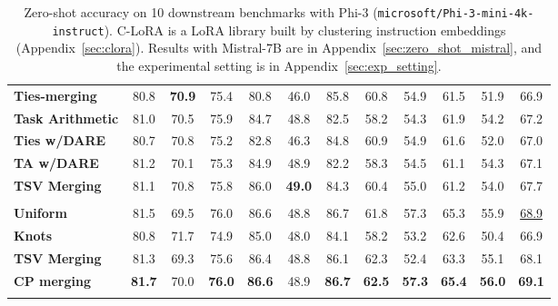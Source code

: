 \begin{table}[ht]
\begin{adjustbox}
\begin{tabular}{l|cccccccccc|c}
\textbf{Ties-merging} & 80.8 & \textbf{70.9} & 75.4 & 80.8 & 46.0 & 85.8 & 60.8 & 54.9 & 61.5 & 51.9 & \cellcolor[HTML]{FDE9E8}66.9 \\
\textbf{Task Arithmetic} & 81.0 & 70.5 & 75.9 & 84.7 & 48.8 & 82.5 & 58.2 & 54.3 & 61.9 & 54.2 & \cellcolor[HTML]{FDE9E8}67.2\\
\textbf{Ties w/DARE} & 80.7 & 70.8 & 75.2 & 82.8 & 46.3 & 84.8 & 60.9 & 54.9 & 61.6 & 52.0 & \cellcolor[HTML]{FDE9E8}67.0  \\
\textbf{TA w/DARE} & 81.2 & 70.1 & 75.3 & 84.9 & 48.9 & 82.2 & 58.3 & 54.5 & 61.1 & 54.3 & \cellcolor[HTML]{FDE9E8}67.1 \\
\textbf{TSV Merging} & 81.1 & 70.8 & 75.8 & 86.0 & \textbf{49.0} & 84.3 & 60.4 & 55.0 & 61.2 & 54.0 & 67.7\cellcolor[HTML]{FDE9E8}\\
\midrule
\rowcolor{lightgray}\multicolumn{12}{c}{\textbf{Phi-3 (3B) with C-LoRA library }} \\
\textbf{Uniform} & 81.5 & 69.5 & 76.0 & 86.6 & 48.8 & 86.7  & 61.8 & 57.3  & 65.3 & 55.9  & \cellcolor[HTML]{FDE9E8}\underline{68.9} \\
\textbf{Knots} & 80.8 & 71.7 & 74.9 & 85.0 & 48.0 & 84.1 & 58.2 & 53.2 & 62.6 & 50.4 & \cellcolor[HTML]{FDE9E8}66.9 \\
\textbf{TSV Merging} & 81.3 & 69.3 & 75.6 & 86.4 & 48.8 & 86.1 & 62.3 & 52.4 & 63.3 & 55.1 & \cellcolor[HTML]{FDE9E8}68.1\\
\textbf{CP merging} & \textbf{81.7} & 70.0 & \textbf{76.0} & \textbf{86.6}  & 48.9 & \textbf{86.7} & \textbf{62.5}& \textbf{57.3}  & \textbf{65.4} & \textbf{56.0}  & \cellcolor[HTML]{FDE9E8}\textbf{69.1}  \\

\midrule


\Xhline{1.6pt}
\end{tabular}
\end{adjustbox}
\caption{Zero-shot accuracy on 10 downstream benchmarks with Phi-3 (\texttt{microsoft/Phi-3-mini-4k-instruct}). C-LoRA is a LoRA library built by clustering instruction embeddings (Appendix~\ref{sec:clora}). Results with Mistral-7B are in Appendix~\ref{sec:zero_shot_mistral}, and the experimental setting is in Appendix~\ref{sec:exp_setting}.}
\label{tab:zeroshot_full}
\end{table}